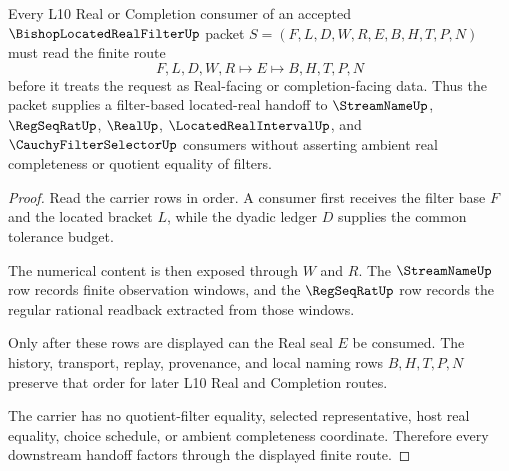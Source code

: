 \begin{theorem}
\label{thm:bishop-located-real-filter-l10-handoff}
Every L10 Real or Completion consumer of an accepted $\BishopLocatedRealFilterUp$ packet $S=(F,L,D,W,R,E,B,H,T,P,N)$ must read the finite route
$$
F,L,D,W,R \longmapsto E \longmapsto B,H,T,P,N
$$
before it treats the request as Real-facing or completion-facing data. Thus the packet supplies a filter-based located-real handoff to $\StreamNameUp$, $\RegSeqRatUp$, $\RealUp$, $\LocatedRealIntervalUp$, and $\CauchyFilterSelectorUp$ consumers without asserting ambient real completeness or quotient equality of filters.
\end{theorem}
\begin{proof}
Read the carrier rows in order. A consumer first receives the filter base $F$ and the located bracket $L$, while the dyadic ledger $D$ supplies the common tolerance budget.

The numerical content is then exposed through $W$ and $R$. The $\StreamNameUp$ row records finite observation windows, and the $\RegSeqRatUp$ row records the regular rational readback extracted from those windows.

Only after these rows are displayed can the Real seal $E$ be consumed. The history, transport, replay, provenance, and local naming rows $B,H,T,P,N$ preserve that order for later L10 Real and Completion routes.

The carrier has no quotient-filter equality, selected representative, host real equality, choice schedule, or ambient completeness coordinate. Therefore every downstream handoff factors through the displayed finite route.
\end{proof}

\begin{closurestatus}{\BishopLocatedRealFilterUp}
  \theoryclosure{\seedClosure}
  \formalstatus{\unformalizedV}
\end{closurestatus}
